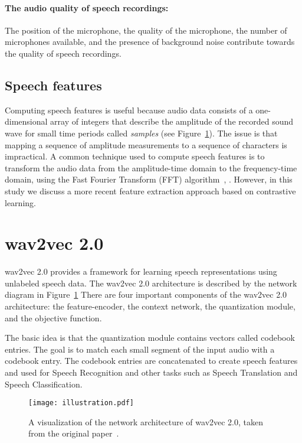 \paragraph*{The audio quality of speech recordings:} The position of the microphone, the quality of the microphone, 
the number of microphones available, and the presence of background noise contribute towards the quality of speech recordings.



\subsection{Speech features}
Computing speech features is useful because audio data consists of a one-dimensional array of integers that describe the
amplitude of the recorded sound wave for small time periods called \emph{samples} (see Figure~\ref{}). 
The issue is that mapping a sequence of amplitude measurements to a sequence of characters is impractical. 
A common technique used to compute speech features is to transform the audio data from the amplitude-time domain 
to the frequency-time domain, using the Fast Fourier Transform (FFT) algorithm~\cite{cochran1967fast}, \cite{cooley1969fast}.
However, in this study we discuss a more recent feature extraction approach based on contrastive learning.



\section{wav2vec 2.0}
wav2vec 2.0 provides a framework for learning speech representations using unlabeled speech data.
The wav2vec 2.0 architecture is described by the network diagram in Figure~\ref{wav2vec2_architecture}
There are four important components of the wav2vec 2.0 architecture: 
the feature-encoder, the context network, the quantization module, and the objective function.

The basic idea is that the quantization module contains vectors called codebook entries. The goal is to match each small
segment of the input audio with a codebook entry. The codebook entries are concatenated to create speech features and used
for Speech Recognition and other tasks such as Speech Translation and Speech Classification.

\begin{figure}
    \centering
    \captionsetup{justification=centering}
    \texttt{[image: illustration.pdf]}
    \caption{A visualization of the network architecture of wav2vec 2.0, taken from the original paper~\cite{baevski2020wav2vec}.}
    \label{wav2vec2_architecture}
\end{figure}




